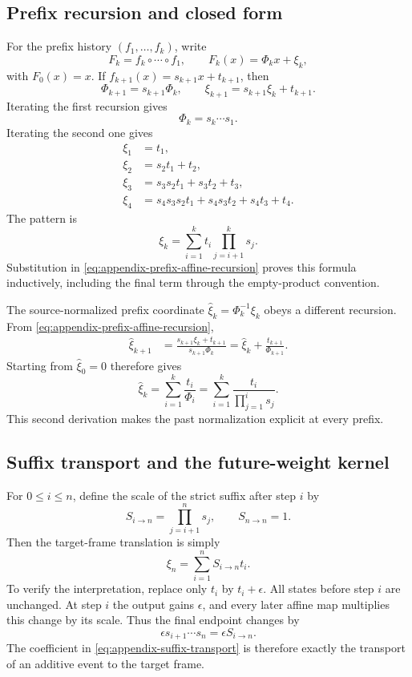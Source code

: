 \subsection{Prefix recursion and closed form}

For the prefix history $(f_1,\ldots,f_k)$, write
\[
  F_k=f_k\circ\cdots\circ f_1,
  \qquad
  F_k(x)=\Phi_kx+\xi_k,
\]
with $F_0(x)=x$.  If $f_{k+1}(x)=s_{k+1}x+t_{k+1}$, then
\begin{equation}
  \Phi_{k+1}=s_{k+1}\Phi_k,
  \qquad
  \xi_{k+1}=s_{k+1}\xi_k+t_{k+1}.
  \label{eq:appendix-prefix-affine-recursion}
\end{equation}
Iterating the first recursion gives
\[
  \Phi_k=s_k\cdots s_1.
\]
Iterating the second one gives
\begin{align*}
  \xi_1&=t_1,\\
  \xi_2&=s_2t_1+t_2,\\
  \xi_3&=s_3s_2t_1+s_3t_2+t_3,\\
  \xi_4&=s_4s_3s_2t_1+s_4s_3t_2+s_4t_3+t_4.
\end{align*}
The pattern is
\[
  \xi_k=\sum_{i=1}^{k}t_i\prod_{j=i+1}^{k}s_j.
\]
Substitution in \eqref{eq:appendix-prefix-affine-recursion} proves this formula
inductively, including the final term through the empty-product convention.

The source-normalized prefix coordinate
$\widehat\xi_k=\Phi_k^{-1}\xi_k$ obeys a different recursion.  From
\eqref{eq:appendix-prefix-affine-recursion},
\begin{align}
  \widehat\xi_{k+1}
  &=\frac{s_{k+1}\xi_k+t_{k+1}}
          {s_{k+1}\Phi_k}
   =\widehat\xi_k+\frac{t_{k+1}}{\Phi_{k+1}}.
  \label{eq:appendix-normalized-prefix-recursion}
\end{align}
Starting from $\widehat\xi_0=0$ therefore gives
\[
  \widehat\xi_k
  =\sum_{i=1}^{k}\frac{t_i}{\Phi_i}
  =\sum_{i=1}^{k}\frac{t_i}{\prod_{j=1}^{i}s_j}.
\]
This second derivation makes the past normalization explicit at every prefix.

\subsection{Suffix transport and the future-weight kernel}

For $0\le i\le n$, define the scale of the strict suffix after step $i$ by
\[
  S_{i\to n}=\prod_{j=i+1}^{n}s_j,
  \qquad S_{n\to n}=1.
\]
Then the target-frame translation is simply
\begin{equation}
  \xi_n=\sum_{i=1}^{n}S_{i\to n}t_i.
  \label{eq:appendix-suffix-transport}
\end{equation}
To verify the interpretation, replace only $t_i$ by $t_i+\epsilon$.  All
states before step $i$ are unchanged.  At step $i$ the output gains
$\epsilon$, and every later affine map multiplies this change by its scale.
Thus the final endpoint changes by
\[
  \epsilon s_{i+1}\cdots s_n
  =\epsilon S_{i\to n}.
\]
The coefficient in \eqref{eq:appendix-suffix-transport} is therefore exactly
the transport of an additive event to the target frame.

